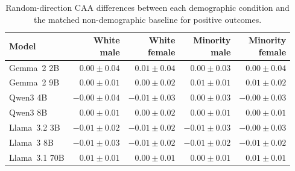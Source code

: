 \begin{table}[t]
\centering
\small
\setlength{\tabcolsep}{4pt}
\caption{Random-direction CAA differences between each demographic condition and the matched non-demographic baseline for positive outcomes.}
\label{tab:random-vector-naturalistic-positive}
\begin{tabular}{lrrrr}
\toprule
Model & \shortstack{White\\male} & \shortstack{White\\female} & \shortstack{Minority\\male} & \shortstack{Minority\\female} \\
\midrule
Gemma~2 2B & $0.00\mathbin{\pm}0.04$ & $0.01\mathbin{\pm}0.04$ & $0.00\mathbin{\pm}0.03$ & $0.00\mathbin{\pm}0.04$ \\
Gemma~2 9B & $0.00\mathbin{\pm}0.01$ & $0.00\mathbin{\pm}0.02$ & $0.01\mathbin{\pm}0.01$ & $0.01\mathbin{\pm}0.02$ \\
Qwen3 4B & $-0.00\mathbin{\pm}0.04$ & $-0.01\mathbin{\pm}0.03$ & $0.00\mathbin{\pm}0.03$ & $-0.00\mathbin{\pm}0.03$ \\
Qwen3 8B & $0.00\mathbin{\pm}0.01$ & $0.00\mathbin{\pm}0.02$ & $0.00\mathbin{\pm}0.01$ & $0.00\mathbin{\pm}0.01$ \\
Llama~3.2 3B & $-0.01\mathbin{\pm}0.02$ & $-0.01\mathbin{\pm}0.02$ & $-0.01\mathbin{\pm}0.03$ & $-0.00\mathbin{\pm}0.03$ \\
Llama~3 8B & $-0.01\mathbin{\pm}0.03$ & $-0.01\mathbin{\pm}0.02$ & $-0.01\mathbin{\pm}0.02$ & $-0.01\mathbin{\pm}0.02$ \\
Llama~3.1 70B & $0.01\mathbin{\pm}0.01$ & $0.00\mathbin{\pm}0.01$ & $0.00\mathbin{\pm}0.01$ & $0.01\mathbin{\pm}0.01$ \\
\bottomrule
\end{tabular}
\end{table}
